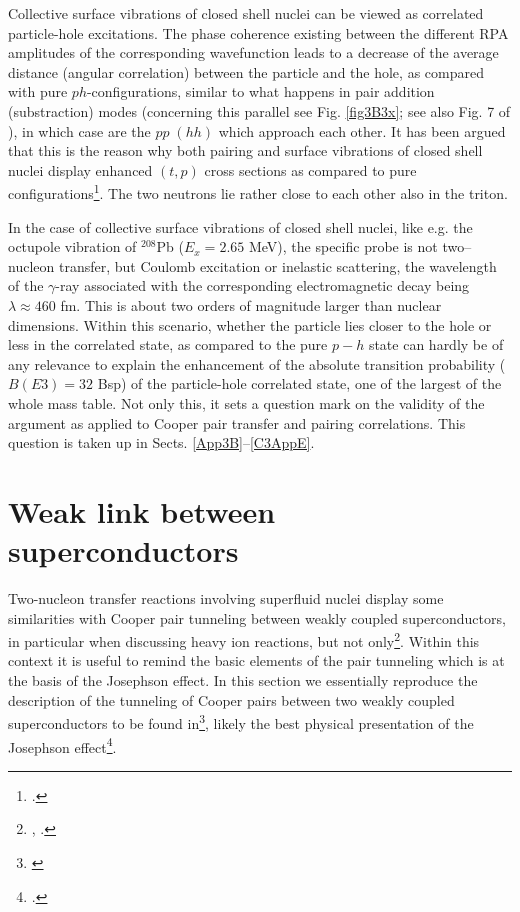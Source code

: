 Collective surface vibrations of closed shell nuclei can be viewed as correlated particle-hole excitations. The phase coherence existing between the different RPA amplitudes of the corresponding wavefunction leads to a decrease of the average distance (angular correlation) between the particle and the hole, as compared with pure $ph$-configurations, similar to what happens in pair addition (substraction) modes (concerning this parallel see Fig. \ref{fig3B3x}; see also Fig. 7 of \cite{Barranco:19b}),  in which case are the $pp\;(hh)$ which approach each other. It has been argued that this is the reason why both pairing and surface vibrations of closed shell nuclei display enhanced $(t,p)$ cross sections as compared to pure configurations\footnote{\cite{Bertsch:67}.}. The two neutrons lie rather close to each other also in the triton.


In the case of collective surface vibrations of closed shell nuclei, like e.g. the octupole vibration of $^{208}$Pb ($E_x=2.65$ MeV), the specific probe is not two--nucleon transfer, but Coulomb excitation or inelastic scattering,  the wavelength of the $\gamma$-ray associated with the corresponding electromagnetic decay being $\lambda\approx 460$ fm. This is about two orders of magnitude larger than nuclear dimensions. Within this scenario, whether  the particle lies closer to the hole or less in the correlated state, as compared to the pure $p-h$ state can hardly be of any relevance to explain  the enhancement of the absolute transition probability ($B(E3)=32$ Bsp) of the particle-hole correlated state, one of the largest of the whole mass table. Not only this, it sets a question mark on the validity of the argument as applied to Cooper pair transfer and pairing correlations. This question is taken up in Sects.  
\ref{App3B}--\ref{C3AppE}.








\section{Weak link between superconductors}\label{C3AppC}
Two-nucleon transfer reactions involving superfluid nuclei display some similarities with Cooper pair tunneling between weakly coupled superconductors, in particular when discussing heavy ion reactions, but not only\footnote{\cite{Goldanskii:68,Dietrich:70,Dietrich:71,Hara:71,Kleber:71,Weiss:79}, \cite{vonOertzen:01,Oertzen:13,Broglia:04a}.}. Within this context it is useful to remind the basic elements of the pair tunneling which is at the basis of the Josephson effect. 
In this section we essentially reproduce the description of the tunneling of Cooper pairs between two weakly coupled superconductors to be found in\footnote{\cite{Anderson:64b}}, likely the best physical presentation of the Josephson effect\footnote{\cite{Josephson:62}.}.


